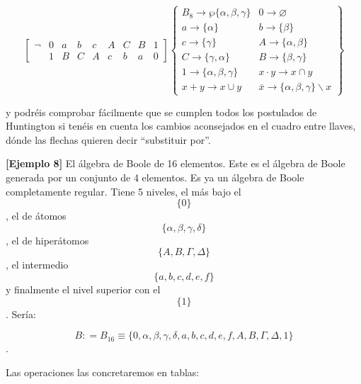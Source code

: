\begin{enumerate}
  \[\begin{bmatrix}
  \neg & 0 & a & b & c & A & C & B & 1 \\
   & 1 & B & C & A & c & b & a & 0
  \end{bmatrix}\begin{Bmatrix}
  {{B_{8}\rightarrow\wp}{\{{\alpha,\beta,\gamma}\}}} & {0\rightarrow\varnothing} \\
  {a\rightarrow{\{\alpha\}}} & {b\rightarrow{\{\beta\}}} \\
  {c\rightarrow{\{\gamma\}}} & {A\rightarrow{\{{\alpha,\beta}\}}} \\
  {C\rightarrow{\{{\gamma,\alpha}\}}} & {B\rightarrow{\{{\beta,\gamma}\}}} \\
  {1\rightarrow{\{{\alpha,\beta,\gamma}\}}} & {{x \cdot y}\rightarrow{x \cap y}} \\
  {{x + y}\rightarrow{x \cup y}} & {\overline{x}\rightarrow{{\{{\alpha,\beta,\gamma}\}} \smallsetminus x}}
  \end{Bmatrix}\]

  y podréis comprobar fácilmente que se cumplen todos los postulados de
  Huntington si te\-néis en cuenta los cambios aconsejados en el cuadro
  entre llaves, dónde las flechas quieren decir ``substituir por''.

  \textbf{{[}Ejemplo 8{]}} El álgebra de Boole de 16 elementos. Este es
  el álgebra de Boole generada por un conjunto de 4 elementos. Es ya un
  álgebra de Boole completamente regular. Tiene 5 niveles, el más bajo
  el \[\{ 0\}\], el de átomos \[\{{\alpha,\beta,\gamma,\delta}\}\], el
  de hiperátomos \[\{{Α,Β,\Gamma,\Delta}\}\], el intermedio
  \[\{{a,b,c,d,e,f}\}\]y finalmente el nivel superior con el \[\{ 1\}\].
  Sería:

  \[B{{: = B_{16}} \equiv {\{{0,\alpha,\beta,\gamma,\delta,a,b,c,d,e,f,Α,Β,\Gamma,\Delta,1}\}}}\].

  Las operaciones las concretaremos en tablas:


\end{enumerate}
